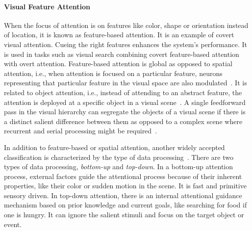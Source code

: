 \paragraph{Visual Feature Attention} 
When the focus of attention is on features like color, shape or orientation instead of location, it is known as feature-based attention. It is an example of covert visual attention. Cueing the right features enhances the system's performance. It is used in tasks such as visual search combining covert feature-based attention with overt attention. Feature-based attention is global as opposed to spatial attention, i.e., when attention is focused on a particular feature, neurons representing that particular feature in the visual space are also modulated~\citep{saenz2002global}. It is related to object attention, i.e., instead of attending to an abstract feature, the attention is deployed at a specific object in a visual scene~\citep{chen2012object}. A single feedforward pass in the visual hierarchy can segregate the objects of a visual scene if there is a distinct salient difference between them as opposed to a complex scene where recurrent and serial processing might be required~\citep{lamme2000distinct}. 

In addition to feature-based or spatial attention, another widely accepted classification is characterized by the type of data processing~\citep{connor2004visual,buschman2007top}. There are two types of data processing, \textit{bottom-up} and \textit{top-down}. In a bottom-up attention process, external factors guide the attentional process because of their inherent properties, like their color or sudden motion in the scene. It is fast and primitive sensory driven. In top-down attention, there is an internal attentional guidance mechanism based on prior knowledge and current goals, like searching for food if one is hungry. It can ignore the salient stimuli and focus on the target object or event. 

